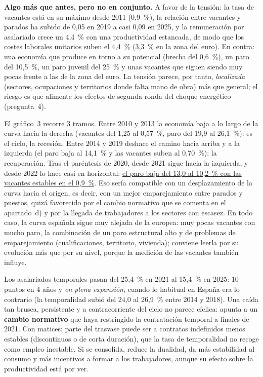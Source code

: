 \begin{examen}
\textbf{Algo más que antes, pero no en conjunto.} A favor de la tensión: la tasa de vacantes está en su máximo desde 2011 (0,9~\%), la relación entre vacantes y parados ha subido de 0,05 en 2019 a casi 0,09 en 2025, y la remuneración por asalariado crece un 4,4~\% con una productividad estancada, de modo que los costes laborales unitarios suben el 4,4~\% (3,3~\% en la zona del euro). En contra: una economía que produce en torno a su potencial (brecha del 0,6~\%), un paro del 10,5~\%, un paro juvenil del 25~\% y unas vacantes que siguen siendo muy pocas frente a las de la zona del euro. La tensión parece, por tanto, \emph{localizada} (sectores, ocupaciones y territorios donde falta mano de obra) más que general; el riesgo es que alimente los efectos de segunda ronda del choque energético (pregunta~4).

El gráfico~3 recorre 3 tramos. Entre 2010 y 2013 la economía baja a lo largo de la curva hacia la derecha (vacantes del 1,25 al 0,57~\%, paro del 19,9 al 26,1~\%): es el ciclo, la recesión. Entre 2014 y 2019 deshace el camino hacia arriba y a la izquierda (el paro baja al 14,1~\% y las vacantes suben al 0,70~\%): la recuperación. Tras el paréntesis de 2020, desde 2021 sigue hacia la izquierda, y desde 2022 lo hace casi en horizontal: \uline{el paro baja del 13,0 al 10,2~\% con las vacantes estables en el 0,9~\%}. Eso sería compatible con un desplazamiento de la curva hacia el origen, es decir, con un mejor emparejamiento entre parados y puestos, quizá favorecido por el cambio normativo que se comenta en el apartado~d) y por la llegada de trabajadores a los sectores con escasez. En todo caso, la curva española sigue muy alejada de la europea: muy pocas vacantes con mucho paro, la combinación de un paro estructural alto y de problemas de emparejamiento (cualificaciones, territorio, vivienda); conviene leerla por su evolución más que por su nivel, porque la medición de las vacantes también influye.

Los asalariados temporales pasan del 25,4~\% en 2021 al 15,4~\% en 2025: 10 puntos en 4 años y \emph{en plena expansión}, cuando lo habitual en España era lo contrario (la temporalidad subió del 24,0 al 26,9~\% entre 2014 y 2018). Una caída tan brusca, persistente y a contracorriente del ciclo no parece cíclica: apunta a un \textbf{cambio normativo} que haya restringido la contratación temporal a finales de 2021. Con matices: parte del trasvase puede ser a contratos indefinidos menos estables (discontinuos o de corta duración), que la tasa de temporalidad no recoge como empleo inestable. Si se consolida, reduce la dualidad, da más estabilidad al consumo y más incentivos a formar a los trabajadores, aunque su efecto sobre la productividad está por ver.


\end{examen}
